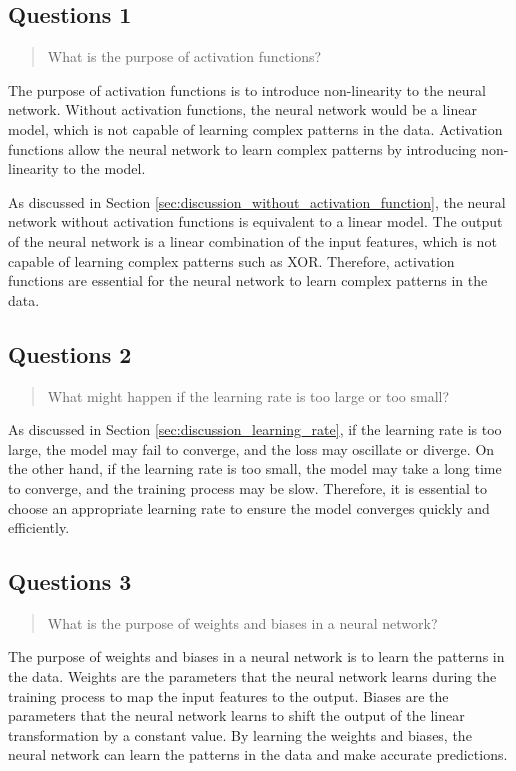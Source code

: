 \subsection{Questions 1}

\begin{quote}
What is the purpose of activation functions?
\end{quote}

The purpose of activation functions is to introduce non-linearity to the neural network. Without activation functions, the neural network would be a linear model, which is not capable of learning complex patterns in the data. Activation functions allow the neural network to learn complex patterns by introducing non-linearity to the model.

As discussed in Section \ref{sec:discussion_without_activation_function}, the neural network without activation functions is equivalent to a linear model.
The output of the neural network is a linear combination of the input features, which is not capable of learning complex patterns such as XOR.
Therefore, activation functions are essential for the neural network to learn complex patterns in the data.


\subsection{Questions 2}

\begin{quote}
What might happen if the learning rate is too large or too small?
\end{quote}

As discussed in Section \ref{sec:discussion_learning_rate}, if the learning rate is too large, the model may fail to converge, and the loss may oscillate or diverge.
On the other hand, if the learning rate is too small, the model may take a long time to converge, and the training process may be slow.
Therefore, it is essential to choose an appropriate learning rate to ensure the model converges quickly and efficiently.

\subsection{Questions 3}

\begin{quote}
What is the purpose of weights and biases in a neural network?
\end{quote}

The purpose of weights and biases in a neural network is to learn the patterns in the data.
Weights are the parameters that the neural network learns during the training process to map the input features to the output.
Biases are the parameters that the neural network learns to shift the output of the linear transformation by a constant value.
By learning the weights and biases, the neural network can learn the patterns in the data and make accurate predictions.
